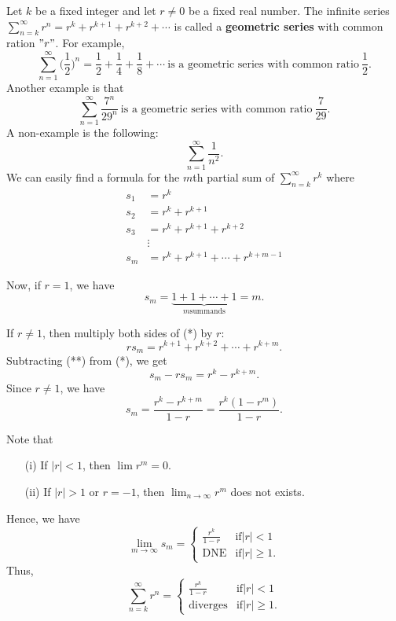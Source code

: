 \documentclass[a4paper]{article}
\begin{document}
Let \( k  \) be a fixed integer and let \( r \neq 0  \) be a fixed real number. The infinite series \( \sum_{ n= k  }^{  \infty   } r^{n} = r^{k } + r^{k +1} + r^{k + 2 } + \cdots   \) is called a \textbf{geometric series} with common ration \( "r" \). For example, 
\[ \sum_{ n=1  }^{ \infty   } \Big(  \frac{ 1 }{ 2 }  \Big)^{n} = \frac{ 1 }{ 2 }  + \frac{ 1 }{ 4 }  + \frac{ 1 }{ 8 }  + \cdots \ \text{is a geometric series with common ratio} \  \frac{ 1 }{ 2 }. \]
Another example is that
\[  \sum_{ n=1  }^{ \infty  } \frac{ 7^{n} }{  29^{n} }  \ \text{is a geometric series with common ratio} \ \frac{ 7  }{  2 9 }. \]
A non-example is the following:
\[  \sum_{ n=1  }^{ \infty   } \frac{ 1 }{ n^{2} }. \]
We can easily find a formula for the \( m \)th partial sum of \( \sum_{ n= k  }^{  \infty   } r^{k } \) where
\begin{align*}
    {s}_{1} &= r^{k} \\
    {s}_{2}&= r^{k } + r^{k+1} \\
    {s}_{3} &= r^{k } + r^{k+1} + r^{k+2} \\
            &\vdots \\
    {s}_{m} &= r^{k } + r^{k+1} + \cdots + r^{k + m - 1} \tag{*}
\end{align*}

Now, if \( r = 1  \), we have
\[  {s}_{m} = \underbrace{1 + 1 + \cdots + 1}_{m \text{summands}} = m.  \]

If \( r \neq 1  \), then multiply both sides of (*) by \( r  \):
\[  r {s}_{m} = r^{k+1} + r^{k+2} + \cdots+ r^{k+m} \tag{**}. \]
Subtracting (**) from (*), we get
\[  {s}_{m} - r {s}_{m} = r^{k} - r^{k + m}. \]
Since \( r \neq 1  \), we have
\[  {s}_{m} = \frac{ r^{k } - r^{k + m} }{ 1 - r  }  = \frac{ r^{k } (1 - r^{m}) }{  1 - r  }. \]

Note that
\begin{enumerate}
    \item[(i)] If \( | r  |  < 1  \), then \( \lim r^{m} = 0  \).
    \item[(ii)] If \( | r  |  > 1  \) or \( r = -1  \), then \( \lim_{ n \to \infty  }  r^{m}  \) does not exists.
\end{enumerate}
Hence, we have 
\[  \lim_{ m \to \infty  }  {s}_{m} = 
\begin{cases}
    \frac{ r^{k } }{  1 - r  }  &\text{if} | r  |  < 1 \\
    \text{DNE} &\text{if} | r  |  \geq 1. 
\end{cases} \]
Thus, 
\[  \sum_{ n= k  }^{  \infty   } r^{n } = 
\begin{cases}
    \frac{ r^{k }  }{  1 - r  }  &\text{if} | r  |  < 1 \\
    \text{diverges} &\text{if} | r  |  \geq 1.
\end{cases} \]
\end{document}
